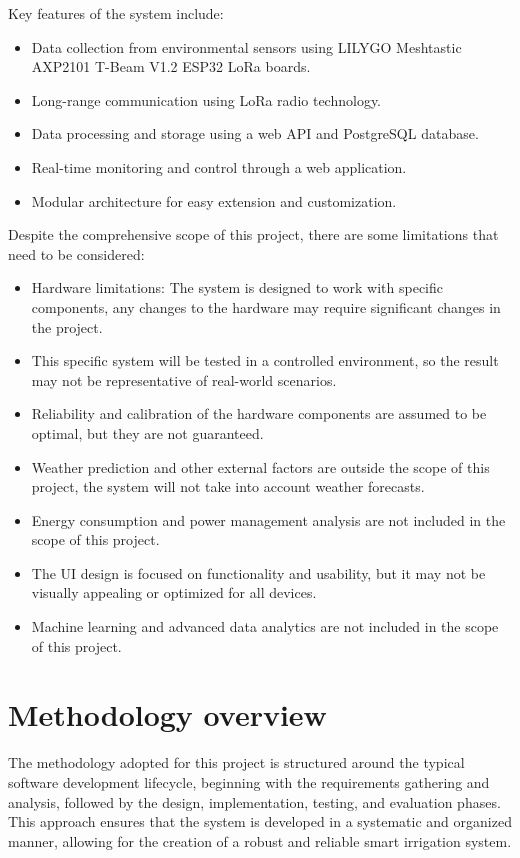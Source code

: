 Key features of the system include:
\begin{itemize}
    \item Data collection from environmental sensors using LILYGO Meshtastic AXP2101 T-Beam V1.2 ESP32 LoRa boards.
    \item Long-range communication using LoRa radio technology.
    \item Data processing and storage using a web API and PostgreSQL database.
    \item Real-time monitoring and control through a web application.
    \item Modular architecture for easy extension and customization.
\end{itemize}
Despite the comprehensive scope of this project, there are some limitations that need to be considered:
\begin{itemize}
    \item Hardware limitations: The system is designed to work with specific components, any changes to
     the hardware may require significant changes in the project.
    \item This specific system will be tested in a controlled environment, so the result may not be representative of 
    real-world scenarios. 
    \item Reliability and calibration of the hardware components are assumed to be optimal, but they are not guaranteed.
    \item Weather prediction and other external factors are outside the scope of this project,
    the system will not take into account weather forecasts.
    \item Energy consumption and power management analysis are not included in the scope of this project.
    \item The UI design is focused on functionality and usability, but it may not be visually appealing or optimized for all devices.
    \item Machine learning and advanced data analytics are not included in the scope of this project.
\end{itemize}

\section{Methodology overview}

The methodology adopted for this project is structured around the typical software development lifecycle,
beginning with the requirements gathering and analysis, followed by the design, implementation, testing, and evaluation phases.
This approach ensures that the system is developed in a systematic and organized manner, allowing for the creation 
of a robust and reliable smart irrigation system.

